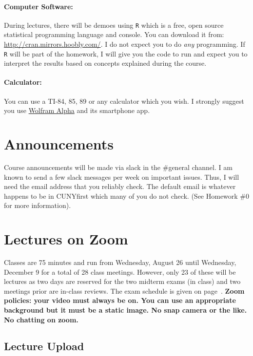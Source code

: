 \documentclass[12pt]{article}
\begin{document}
\paragraph{Computer Software:} During lectures, there will be demoes using \texttt{R} which is a free, open source statistical programming language and console. You can download it from: \url{http://cran.mirrors.hoobly.com/}. I do not expect you to do \textit{any} programming. If \texttt{R} will be part of the homework, I will give you the code to run and expect you to interpret the results based on concepts explained during the course.

\paragraph{Calculator:} You can use a TI-84, 85, 89 or any calculator which you wish. I strongly suggest you use \href{http://www.wolframalpha.com/}{Wolfram Alpha} and its smartphone app.

\section*{Announcements}

Course announcements will be made via slack in the \#general channel. I am known to send a few slack messages per week on important issues. Thus, I will need the email address that you reliably check. The default email is whatever happens to be in CUNYfirst which many of you do not check. (See Homework \#0 for more information).

\section*{Lectures on Zoom}

Classes are 75 minutes and run from Wednesday, August 26 until Wednesday, December 9 for a total of 28 class meetings. However, only 23 of these will be lectures as two days are reserved for the two midterm exams (in class) and two meetings prior are in-class reviews. The exam schedule is given on page~\pageref{subsec:exam_schedule}. \textbf{Zoom policies: your video must always be on. You can use an appropriate background but it must be a static image. No snap camera or the like. No chatting on zoom.}

\subsection*{Lecture Upload}
\end{document}
